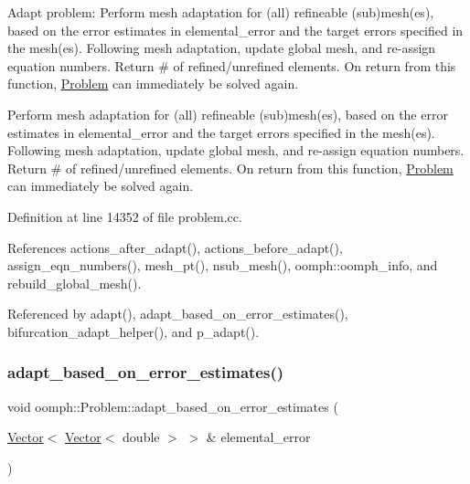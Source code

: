 Adapt problem\+: Perform mesh adaptation for (all) refineable (sub)mesh(es), based on the error estimates in elemental\+\_\+error and the target errors specified in the mesh(es). Following mesh adaptation, update global mesh, and re-\/assign equation numbers. Return \# of refined/unrefined elements. On return from this function, \hyperlink{classoomph_1_1Problem}{Problem} can immediately be solved again. 

Perform mesh adaptation for (all) refineable (sub)mesh(es), based on the error estimates in elemental\+\_\+error and the target errors specified in the mesh(es). Following mesh adaptation, update global mesh, and re-\/assign equation numbers. Return \# of refined/unrefined elements. On return from this function, \hyperlink{classoomph_1_1Problem}{Problem} can immediately be solved again. 

Definition at line 14352 of file problem.\+cc.



References actions\+\_\+after\+\_\+adapt(), actions\+\_\+before\+\_\+adapt(), assign\+\_\+eqn\+\_\+numbers(), mesh\+\_\+pt(), nsub\+\_\+mesh(), oomph\+::oomph\+\_\+info, and rebuild\+\_\+global\+\_\+mesh().



Referenced by adapt(), adapt\+\_\+based\+\_\+on\+\_\+error\+\_\+estimates(), bifurcation\+\_\+adapt\+\_\+helper(), and p\+\_\+adapt().

\mbox{\label{classoomph_1_1Problem_a7bf1b55fe1bb0cc02fd0b7a868a58c3b}} 
\subsubsection{\texorpdfstring{adapt\+\_\+based\+\_\+on\+\_\+error\+\_\+estimates()}{adapt\_based\_on\_error\_estimates()}\hspace{0.1cm}{\footnotesize\ttfamily [2/2]}}
{\footnotesize\ttfamily void oomph\+::\+Problem\+::adapt\+\_\+based\+\_\+on\+\_\+error\+\_\+estimates (\begin{DoxyParamCaption}\item[{\hyperlink{classoomph_1_1Vector}{Vector}$<$ \hyperlink{classoomph_1_1Vector}{Vector}$<$ double $>$ $>$ \&}]{elemental\+\_\+error }\end{DoxyParamCaption})\hspace{0.3cm}{\ttfamily [inline]}}



